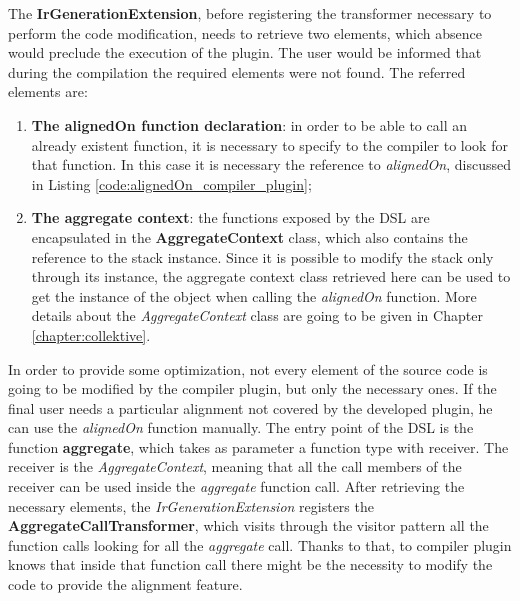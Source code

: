 The \textbf{IrGenerationExtension}, before registering the transformer necessary to perform the code modification, needs to retrieve two elements, which absence would preclude the execution of the plugin. The user would be informed that during the compilation the required elements were not found.\newline
The referred elements are:
\begin{enumerate}
    \item \textbf{The alignedOn function declaration}: in order to be able to call an already existent function, it is necessary to specify to the compiler to look for that function. In this case it is necessary the reference to \textit{alignedOn}, discussed in Listing \ref{code:alignedOn_compiler_plugin};
    \item \textbf{The aggregate context}: the functions exposed by the DSL are encapsulated in the \textbf{AggregateContext} class, which also contains the reference to the stack instance. Since it is possible to modify the stack only through its instance, the aggregate context class retrieved here can be used to get the instance of the object when calling the \textit{alignedOn} function. More details about the \textit{AggregateContext} class are going to be given in Chapter \ref{chapter:collektive}.
\end{enumerate}

In order to provide some optimization, not every element of the source code is going to be modified by the compiler plugin, but only the necessary ones. If the final user needs a particular alignment not covered by the developed plugin, he can use the \textit{alignedOn} function manually.\newline
The entry point of the DSL is the function \textbf{aggregate}, which takes as parameter a function type with receiver. The receiver is the \textit{AggregateContext}, meaning that all the call members of the receiver can be used inside the \textit{aggregate} function call.\newline
After retrieving the necessary elements, the \textit{IrGenerationExtension} registers the \textbf{AggregateCallTransformer}, which visits through the visitor pattern all the function calls looking for all the \textit{aggregate} call. Thanks to that, to compiler plugin knows that inside that function call there might be the necessity to modify the code to provide the alignment feature.

